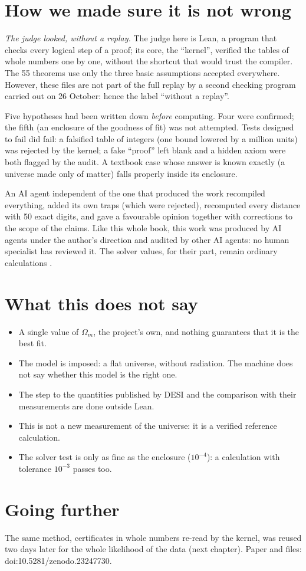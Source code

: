 \section*{How we made sure it is not wrong}

 \emph{The judge looked, without a replay.} The judge here is Lean, a program that checks every logical
step of a proof; its core, the ``kernel'', verified the tables of whole numbers one by one, without the shortcut
that would trust the compiler. The 55 theorems use only the three basic assumptions accepted everywhere. However,
these files are not part of the full replay by a second checking program carried out on 26 October: hence the
label ``without a replay''.

Five hypotheses had been written down \emph{before} computing. Four were confirmed; the fifth (an enclosure of the
goodness of fit) was not attempted. Tests designed to fail did fail: a falsified table of integers (one bound lowered
by a million units) was rejected by the kernel; a fake ``proof'' left blank and a hidden axiom were both flagged by
the audit. A textbook case whose answer is known exactly (a universe made only of matter) falls properly inside its
enclosure.

An AI agent independent of the one that produced the work recompiled everything, added its own traps (which were
rejected), recomputed every distance with 50 exact digits, and gave a favourable opinion together with corrections to
the scope of the claims. Like this whole book, this work was produced by AI agents under the author's direction and
audited by other AI agents: no human specialist has reviewed it. The solver values, for their part, remain ordinary
calculations .

\section*{What this does not say}

\begin{limite}
\begin{itemize}
\item A single value of $\Omega_m$, the project's own, and nothing guarantees that it is the best fit.
\item The model is imposed: a flat universe, without radiation. The machine does not say whether this model is the
right one.
\item The step to the quantities published by DESI and the comparison with their measurements are done outside Lean.
\item This is not a new measurement of the universe: it is a verified reference calculation.
\item The solver test is only as fine as the enclosure ($10^{-4}$): a calculation with tolerance $10^{-3}$ passes too.
\end{itemize}
\end{limite}

\section*{Going further}

The same method, certificates in whole numbers re-read by the kernel, was reused two days later for the whole
likelihood of the data (next chapter). Paper and files: doi:10.5281/zenodo.23247730.
